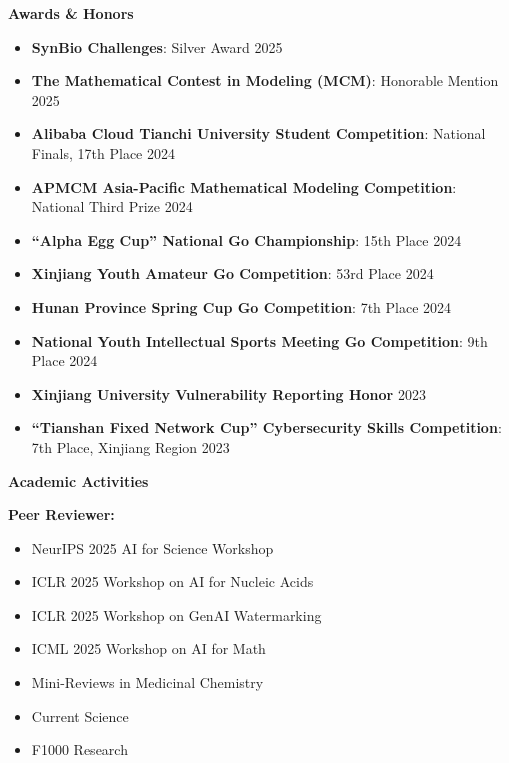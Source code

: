 \documentclass[11pt]{article}
\begin{document}
	\vspace{12pt}
	
	\begin{center}
		\textbf{\large Awards \& Honors}
	\end{center}
	\begin{itemize}[noitemsep, topsep=0pt, partopsep=0pt, parsep=0pt, leftmargin=*]
		\item \textbf{SynBio Challenges}: Silver Award \hfill 2025
		\item \textbf{The Mathematical Contest in Modeling (MCM)}: Honorable Mention \hfill 2025
		\item \textbf{Alibaba Cloud Tianchi University Student Competition}: National Finals, 17th Place \hfill 2024
		\item \textbf{APMCM Asia-Pacific Mathematical Modeling Competition}: National Third Prize \hfill 2024
		\item \textbf{“Alpha Egg Cup” National Go Championship}: 15th Place \hfill 2024
		\item \textbf{Xinjiang Youth Amateur Go Competition}: 53rd Place \hfill 2024
		\item \textbf{Hunan Province Spring Cup Go Competition}: 7th Place \hfill 2024
		\item \textbf{National Youth Intellectual Sports Meeting Go Competition}: 9th Place \hfill 2024
		\item \textbf{Xinjiang University Vulnerability Reporting Honor} \hfill 2023
		\item \textbf{“Tianshan Fixed Network Cup” Cybersecurity Skills Competition}: 7th Place, Xinjiang Region \hfill 2023
	\end{itemize}

	\clearpage
	\begin{center}
		\textbf{\large Academic Activities}
	\end{center}
	\textbf{Peer Reviewer:}
	\begin{multicols}{2}
		\begin{itemize}[noitemsep, topsep=0pt, partopsep=0pt, parsep=0pt, leftmargin=*]
			\item NeurIPS 2025 AI for Science Workshop
			\item ICLR 2025 Workshop on AI for Nucleic Acids
			\item ICLR 2025 Workshop on GenAI Watermarking
			\item ICML 2025 Workshop on AI for Math
			\item Mini-Reviews in Medicinal Chemistry
			\item Current Science
			\item F1000 Research
		\end{itemize}
	\end{multicols}
	
\end{document}
